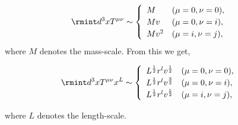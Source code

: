 \begin{equation}\rmint d^3xT^{\mu\nu}\sim \begin{cases}
\begin{array}{ll}
M & (\mu=0,\nu=0),\\
Mv & (\mu=0,\nu=i),\\
Mv^2 & (\mu=i,\nu=j),\\
\end{array}
\end{cases}
\end{equation}
where $M$ denotes the mass-scale. From this we get,

\begin{equation}\rmint d^3x T^{\mu\nu}x^L\sim \begin{cases}
\begin{array}{ll}
L^{\frac{1}{2}}r^lv^{\frac{1}{2}} & (\mu=0,\nu=0),\\
L^{\frac{1}{2}}r^lv^{\frac{3}{2}} & (\mu=0,\nu=i),\\
L^{\frac{1}{2}}r^lv^{\frac{5}{2}} & (\mu=i,\nu=j),\\
\end{array}
\end{cases}
\end{equation}

where $L$ denotes the length-scale.


